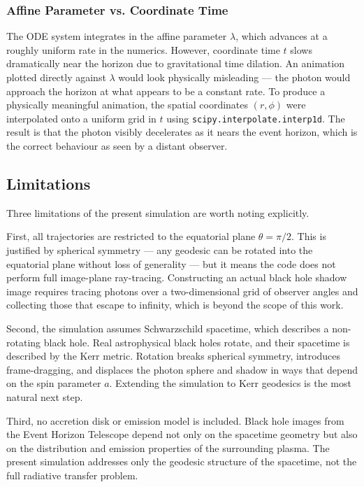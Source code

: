 \documentclass[12pt,a4paper]{article}
\begin{document}
\subsubsection{Affine Parameter vs. Coordinate Time}
The ODE system integrates in the affine parameter $\lambda$, which advances at
a roughly uniform rate in the numerics. However, coordinate time $t$ slows
dramatically near the horizon due to gravitational time dilation. An animation
plotted directly against $\lambda$ would look physically misleading — the photon
would approach the horizon at what appears to be a constant rate. To produce a
physically meaningful animation, the spatial coordinates $(r, \phi)$ were
interpolated onto a uniform grid in $t$ using \texttt{scipy.interpolate.interp1d}.
The result is that the photon visibly decelerates as it nears the event horizon,
which is the correct behaviour as seen by a distant observer.

\subsection{Limitations}

Three limitations of the present simulation are worth noting explicitly.

First, all trajectories are restricted to the equatorial plane $\theta = \pi/2$.
This is justified by spherical symmetry — any geodesic can be rotated into the
equatorial plane without loss of generality — but it means the code does not
perform full image-plane ray-tracing. Constructing an actual black hole shadow
image requires tracing photons over a two-dimensional grid of observer angles
and collecting those that escape to infinity, which is beyond the scope of this
work.

Second, the simulation assumes Schwarzschild spacetime, which describes a
non-rotating black hole. Real astrophysical black holes rotate, and their
spacetime is described by the Kerr metric. Rotation breaks spherical symmetry,
introduces frame-dragging, and displaces the photon sphere and shadow in ways
that depend on the spin parameter $a$. Extending the simulation to Kerr
geodesics is the most natural next step.

Third, no accretion disk or emission model is included. Black hole images from
the Event Horizon Telescope depend not only on the spacetime geometry but also
on the distribution and emission properties of the surrounding plasma. The present
simulation addresses only the geodesic structure of the spacetime, not the full
radiative transfer problem.
\end{document}
